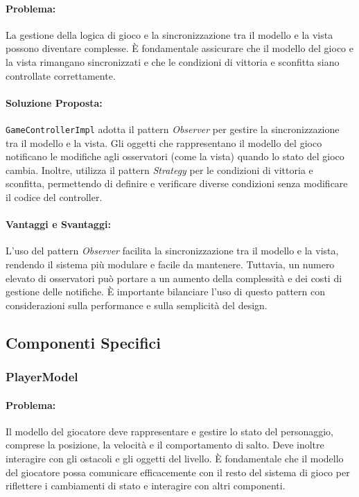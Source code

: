 \documentclass[a4paper,12pt]{report}
\begin{document}
	\paragraph{Problema:} La gestione della logica di gioco e la sincronizzazione tra il modello e la vista possono diventare complesse. È fondamentale assicurare che il modello del gioco e la vista rimangano sincronizzati e che le condizioni di vittoria e sconfitta siano controllate correttamente.
	
	\paragraph{Soluzione Proposta:} \texttt{GameControllerImpl} adotta il pattern \textit{Observer} per gestire la sincronizzazione tra il modello e la vista. Gli oggetti che rappresentano il modello del gioco notificano le modifiche agli osservatori (come la vista) quando lo stato del gioco cambia. Inoltre, utilizza il pattern \textit{Strategy} per le condizioni di vittoria e sconfitta, permettendo di definire e verificare diverse condizioni senza modificare il codice del controller.
	
	\paragraph{Vantaggi e Svantaggi:} 
	L'uso del pattern \textit{Observer} facilita la sincronizzazione tra il modello e la vista, rendendo il sistema più modulare e facile da mantenere. Tuttavia, un numero elevato di osservatori può portare a un aumento della complessità e dei costi di gestione delle notifiche. È importante bilanciare l'uso di questo pattern con considerazioni sulla performance e sulla semplicità del design.
	
	\subsection{Componenti Specifici}
	
	\subsubsection{PlayerModel}
	
	\paragraph{Problema:} Il modello del giocatore deve rappresentare e gestire lo stato del personaggio, comprese la posizione, la velocità e il comportamento di salto. Deve inoltre interagire con gli ostacoli e gli oggetti del livello. È fondamentale che il modello del giocatore possa comunicare efficacemente con il resto del sistema di gioco per riflettere i cambiamenti di stato e interagire con altri componenti.
	
\end{document}
